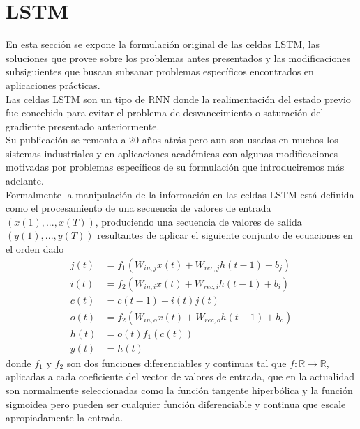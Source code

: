 \documentclass{article}
\begin{document}
	\pagebreak
	\section{LSTM}\label{sectionLSTM}
	En esta sección se expone la formulación original de las celdas LSTM, las soluciones que provee sobre los problemas antes presentados y las modificaciones subsiguientes que buscan subsanar problemas específicos encontrados en aplicaciones prácticas.\\
	Las celdas LSTM son un tipo de RNN donde la realimentación del estado previo fue concebida para evitar el problema de desvanecimiento o saturación del gradiente presentado anteriormente. \\
	Su publicación se remonta a 20 años atrás pero aun son usadas en muchos los sistemas industriales\cite{13SpeechRecognition, 12DeepSearch, 56MicrosoftSpeechRecognition} y en aplicaciones académicas\cite{15TransductionGraves, 43ParsingScenesRecursively, 44SpeechRecognition, 52MachineTranslationAttentionRNN} con algunas modificaciones motivadas por problemas específicos de su formulación que introduciremos más adelante.\\
	Formalmente la manipulación de la información en las celdas LSTM está definida como el procesamiento de una secuencia de valores de entrada \textit{$(x(1) , ... , x(T))$}, produciendo una secuencia de valores de salida \textit{ $(y(1), ... , y(T))$} resultantes de aplicar el siguiente conjunto de ecuaciones en el orden dado
	\begin{equation*}
	\begin{split}
	j(t) &= f_1(W_{in, j} x(t) + W_{rec, j} h(t-1) + b_{j})\\
	i(t) &= f_2(W_{in, i} x(t) + W_{rec, i} h(t-1) + b_{i})\\
	c(t) &= c(t-1) + i(t)j(t)\\
	o(t) &= f_2(W_{in, o} x(t) + W_{rec, o} h(t-1) + b_o)\\
	h(t) &= o(t)f_1(c(t))\\
	y(t) &= h(t)
	\end{split}
	\end{equation*}
	donde $f_1$ y $f_2$ son dos funciones diferenciables y continuas tal que $f: \mathbb{R} \rightarrow \mathbb{R}$, aplicadas a cada coeficiente del vector de valores de entrada, que en la actualidad son normalmente seleccionadas como la función tangente hiperbólica y la función sigmoidea pero pueden ser cualquier función diferenciable y continua que escale apropiadamente la entrada.\\
\end{document}
